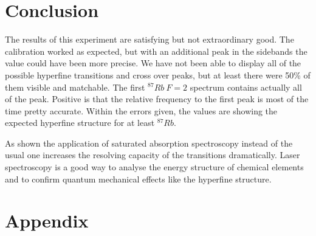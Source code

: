 \documentclass[]{article}
\begin{document}
\newpage
\section{Conclusion}
The results of this experiment are satisfying but not extraordinary good. The calibration worked as expected, but with an additional peak in the sidebands the value could have been more precise. We have not been able to display all of the possible hyperfine transitions and cross over peaks, but at least there were 50\% of them visible and matchable. The first $^{87}Rb\ F=2$ spectrum contains actually all of the peak. Positive is that the relative frequency to the first peak is most of the time pretty accurate. Within the errors given, the values are showing the expected hyperfine structure for at least $^{87}Rb$.

As shown the application of saturated absorption spectroscopy instead of the usual one increases the resolving capacity of the transitions dramatically. Laser spectroscopy is a good way to analyse the energy structure of chemical elements and to confirm quantum mechanical effects like the hyperfine structure.

\section{Appendix}
\end{document}
